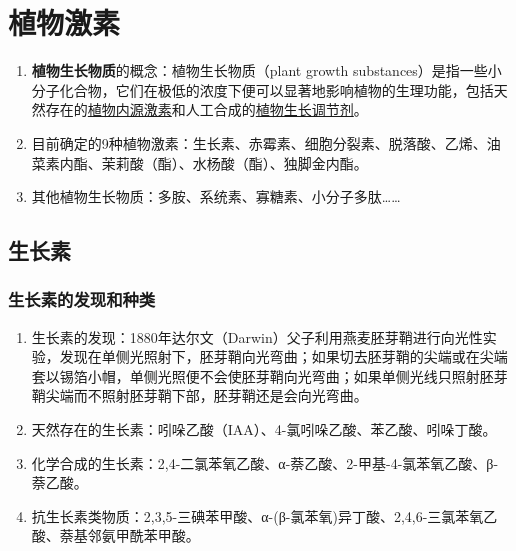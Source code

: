 \chapter{植物激素}
\begin{enumerate}
    \item \textbf{植物生长物质}的概念：植物生长物质（plant growth substances）是指一些小分子化合物，它们在极低的浓度下便可以显著地影响植物的生理功能，包括天然存在的\uline{植物内源激素}和人工合成的\uline{植物生长调节剂}。
    \item 目前确定的9种植物激素：生长素、赤霉素、细胞分裂素、脱落酸、乙烯、油菜素内酯、茉莉酸（酯）、水杨酸（酯）、独脚金内酯。
    \item 其他植物生长物质：多胺、系统素、寡糖素、小分子多肽……
\end{enumerate}

\section{生长素}
\subsection{生长素的发现和种类}
\begin{enumerate}
    \item 生长素的发现：1880年达尔文（Darwin）父子利用燕麦胚芽鞘进行向光性实验，发现在单侧光照射下，胚芽鞘向光弯曲；如果切去胚芽鞘的尖端或在尖端套以锡箔小帽，单侧光照便不会使胚芽鞘向光弯曲；如果单侧光线只照射胚芽鞘尖端而不照射胚芽鞘下部，胚芽鞘还是会向光弯曲。
    \item 天然存在的生长素：吲哚乙酸（IAA）、4-氯吲哚乙酸、苯乙酸、吲哚丁酸。
    \item 化学合成的生长素：2,4-二氯苯氧乙酸、α-萘乙酸、2-甲基-4-氯苯氧乙酸、β-萘乙酸。
    \item 抗生长素类物质：2,3,5-三碘苯甲酸、α-(β-氯苯氧)异丁酸、2,4,6-三氯苯氧乙酸、萘基邻氨甲酰苯甲酸。
\end{enumerate}
